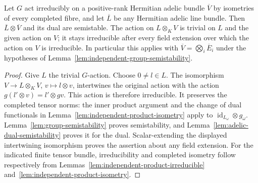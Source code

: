 \begin{corollary}
\label{cor:group-line-twist-semistability}
\leanok
Let $G$ act irreducibly on a positive-rank Hermitian adelic bundle
$\overline V$ by isometries of every completed fibre, and let
$\overline L$ be any Hermitian adelic line bundle. Then
$\overline L\otimes\overline V$ and its dual are semistable.
The action on $L\otimes_K V$ is trivial on $L$ and the given action on $V$;
it stays irreducible after every field extension over which the action on
$V$ is irreducible.
In particular this applies with
$\overline V=\bigotimes_i\overline E_i$ under the hypotheses of
Lemma~\ref{lem:independent-group-semistability}.
\end{corollary}
\begin{proof}
Give $L$ the trivial $G$-action. Choose $0\ne l\in L$. The isomorphism
$V\to L\otimes_K V$, $v\mapsto l\otimes v$, intertwines the original
action with the action $g(l'\otimes v)=l'\otimes gv$.
This action is therefore irreducible. It preserves the completed tensor
norms: the inner product argument and the change of dual functionals
in Lemma~\ref{lem:independent-product-isometry} apply to
$\operatorname{id}_{L_\omega}\otimes g_\omega$.
Lemma~\ref{lem:group-semistability} proves semistability, and
Lemma~\ref{lem:adelic-dual-semistability} proves it for the dual.
Scalar-extending the displayed intertwining isomorphism proves the assertion
about any field extension.
For the indicated finite tensor bundle, irreducibility and completed
isometry follow respectively from
Lemmas~\ref{lem:independent-product-irreducible}
and~\ref{lem:independent-product-isometry}.
\end{proof}
